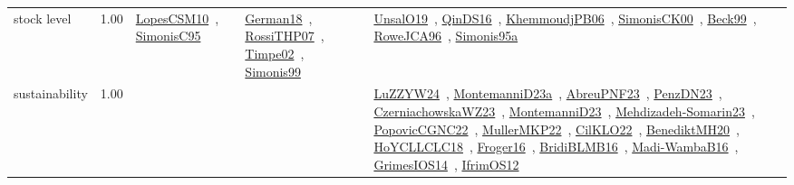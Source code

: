 {\begin{longtable}{p{3cm}r>{\raggedright\arraybackslash}p{6cm}>{\raggedright\arraybackslash}p{6cm}>{\raggedright\arraybackslash}p{8cm}}
\index{stock level}\index{Concepts!stock level}stock level &  1.00 & \href{../works/LopesCSM10.pdf}{LopesCSM10}~\cite{LopesCSM10}, \href{../works/SimonisC95.pdf}{SimonisC95}~\cite{SimonisC95} & \href{../works/German18.pdf}{German18}~\cite{German18}, \href{../works/RossiTHP07.pdf}{RossiTHP07}~\cite{RossiTHP07}, \href{../works/Timpe02.pdf}{Timpe02}~\cite{Timpe02}, \href{../works/Simonis99.pdf}{Simonis99}~\cite{Simonis99} & \href{../works/UnsalO19.pdf}{UnsalO19}~\cite{UnsalO19}, \href{../works/QinDS16.pdf}{QinDS16}~\cite{QinDS16}, \href{../works/KhemmoudjPB06.pdf}{KhemmoudjPB06}~\cite{KhemmoudjPB06}, \href{../works/SimonisCK00.pdf}{SimonisCK00}~\cite{SimonisCK00}, \href{../works/Beck99.pdf}{Beck99}~\cite{Beck99}, \href{../works/RoweJCA96.pdf}{RoweJCA96}~\cite{RoweJCA96}, \href{../works/Simonis95a.pdf}{Simonis95a}~\cite{Simonis95a}\\
\index{sustainability}\index{Concepts!sustainability}sustainability &  1.00 &  &  & \href{../works/LuZZYW24.pdf}{LuZZYW24}~\cite{LuZZYW24}, \href{../works/MontemanniD23a.pdf}{MontemanniD23a}~\cite{MontemanniD23a}, \href{../works/AbreuPNF23.pdf}{AbreuPNF23}~\cite{AbreuPNF23}, \href{../works/PenzDN23.pdf}{PenzDN23}~\cite{PenzDN23}, \href{../works/CzerniachowskaWZ23.pdf}{CzerniachowskaWZ23}~\cite{CzerniachowskaWZ23}, \href{../works/MontemanniD23.pdf}{MontemanniD23}~\cite{MontemanniD23}, \href{../works/Mehdizadeh-Somarin23.pdf}{Mehdizadeh-Somarin23}~\cite{Mehdizadeh-Somarin23}, \href{../works/PopovicCGNC22.pdf}{PopovicCGNC22}~\cite{PopovicCGNC22}, \href{../works/MullerMKP22.pdf}{MullerMKP22}~\cite{MullerMKP22}, \href{../works/CilKLO22.pdf}{CilKLO22}~\cite{CilKLO22}, \href{../works/BenediktMH20.pdf}{BenediktMH20}~\cite{BenediktMH20}, \href{../works/HoYCLLCLC18.pdf}{HoYCLLCLC18}~\cite{HoYCLLCLC18}, \href{../works/Froger16.pdf}{Froger16}~\cite{Froger16}, \href{../works/BridiBLMB16.pdf}{BridiBLMB16}~\cite{BridiBLMB16}, \href{../works/Madi-WambaB16.pdf}{Madi-WambaB16}~\cite{Madi-WambaB16}, \href{../works/GrimesIOS14.pdf}{GrimesIOS14}~\cite{GrimesIOS14}, \href{../works/IfrimOS12.pdf}{IfrimOS12}~\cite{IfrimOS12}\\

\end{longtable}}
